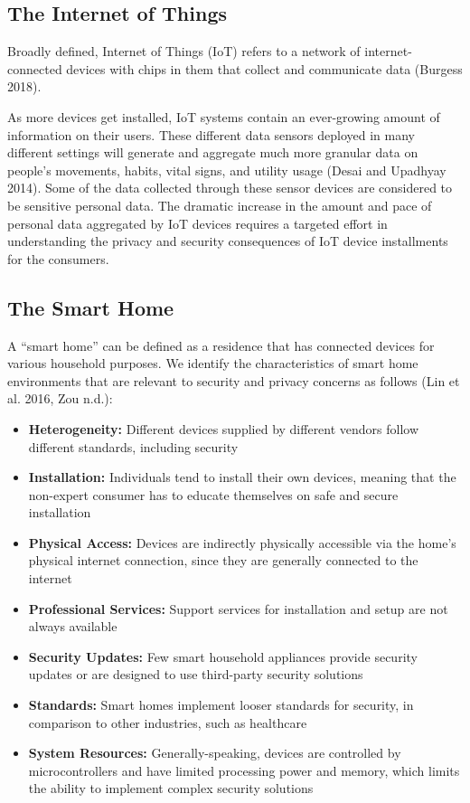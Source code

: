 \subsection{The Internet of Things}

Broadly defined, Internet of Things (IoT) refers to a network of internet-connected devices with chips in them that collect and communicate data (Burgess 2018).

As more devices get installed, IoT systems contain an ever-growing amount of information on their users. These different data sensors deployed in many different settings will generate and aggregate much more granular data on people’s movements, habits, vital signs, and utility usage (Desai and Upadhyay 2014). Some of the data collected through these sensor devices are considered to be sensitive personal data. The dramatic increase in the amount and pace of personal data aggregated by IoT devices requires a targeted effort in understanding the privacy and security consequences of IoT device installments for the consumers.

\subsection{The Smart Home}

A “smart home” can be defined as a residence that has connected devices for various household purposes. We identify the characteristics of smart home environments that are relevant to security and privacy concerns as follows (Lin et al. 2016, Zou n.d.):

\begin{itemize}
\item {\bf Heterogeneity:} Different devices supplied by different vendors follow different standards, including security
\item {\bf Installation:} Individuals tend to install their own devices, meaning that the non-expert consumer has to educate themselves on safe and secure installation
\item {\bf Physical Access:} Devices are indirectly physically accessible via the home’s physical internet connection, since they are generally connected to the internet
\item {\bf Professional Services:} Support services for installation and setup are not always available
\item {\bf Security Updates:} Few smart household appliances provide security updates or are designed to use third-party  security solutions
\item {\bf Standards:} Smart homes implement looser standards for security, in comparison to other industries, such as healthcare
\item {\bf System Resources:} Generally-speaking, devices are controlled by microcontrollers and have limited processing power and memory, which limits the ability to implement complex security solutions
\end{itemize}

